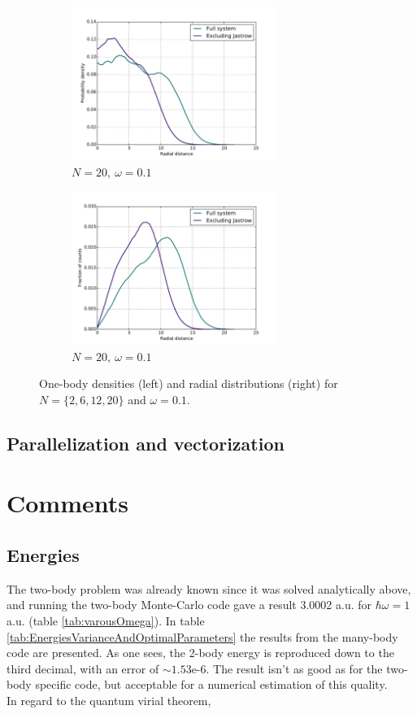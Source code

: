 \documentclass[english, a4paper]{article}
\begin{document}
\begin{figure}[H]
	\begin{subfigure}{0.5\textwidth}
		\includegraphics[width=\textwidth, height= 5cm]{figures/radialDistribution/OneBodyDensityN20w10Se8.pdf}
		\caption{$N=20,\:\omega=0.1$}
	\end{subfigure}
	\begin{subfigure}{0.5\textwidth}
		\includegraphics[width=\textwidth, height= 5cm]{figures/radialDistribution/radialDistributionN20w10Se7.pdf}
		\caption{$N=20,\:\omega=0.1$}
	\end{subfigure}

	\vspace{3mm}
	
	\caption{One-body densities (left) and radial distributions (right) for $N=\{2,6,12,20\}$ and $\omega = 0.1$.}
	\label{fig:Onebody&RadialDistw10}
\end{figure}
	
	\subsection{Parallelization and vectorization}
	
	
	\section{Comments}
	\subsection{Energies}
	The two-body problem was already known since it was solved analytically above, and running the two-body Monte-Carlo code gave a result 3.0002 a.u. for $\hbar\omega = 1$ a.u. (table \ref{tab:varousOmega}). In table \ref{tab:EnergiesVarianceAndOptimalParameters} the results from the many-body code are presented. As one sees, the 2-body energy is reproduced down to the third decimal, with an error of $\sim 1.53$e-6. The result isn't as good as for the two-body specific code, but acceptable for a numerical estimation of this quality.\\
	In regard to the quantum virial theorem,
	
\end{document}
